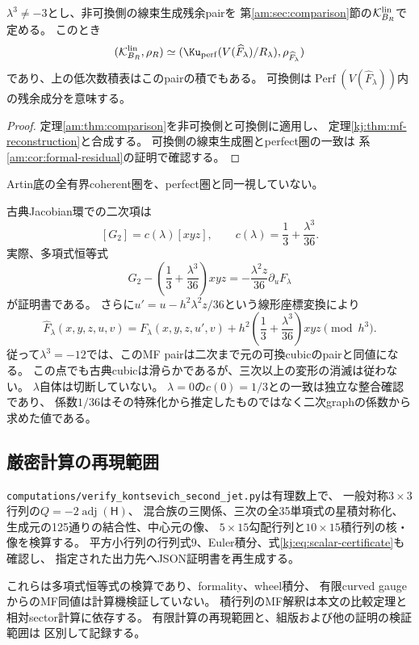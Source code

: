 \begin{corollary}[線束生成射影残余pairの二次復元]
\label{kj:cor:conditional-Ku}
$\lambda^3\ne-3$とし、非可換側の線束生成残余pairを
第\ref{am:sec:comparison}節の$\mathcal K_{B_R}^{\rm lin}$で定める。
このとき
\[
 (\mathcal K_{B_R}^{\rm lin},\rho_R)\simeq
 (\Ku_{\rm perf}(V(\widehat F_\lambda)/R_\lambda),\rho_{\widehat F_\lambda})
\]
であり、上の低次数積表はこのpairの積でもある。
可換側は$\operatorname{Perf}(V(\widehat F_\lambda))$内の残余成分を意味する。
\end{corollary}
\begin{proof}
定理\ref{am:thm:comparison}を非可換側と可換側に適用し、
定理\ref{kj:thm:mf-reconstruction}と合成する。
可換側の線束生成圏とperfect圏の一致は
系\ref{am:cor:formal-residual}の証明で確認する。
\end{proof}
Artin底の全有界coherent圏を、perfect圏と同一視していない。

古典Jacobian環での二次項は
\begin{equation}\label{kj:eq:scalar}
 [G_2]=c(\lambda)[xyz],\qquad
 c(\lambda)=\frac13+\frac{\lambda^3}{36}.
\end{equation}
実際、多項式恒等式
\begin{equation}\label{kj:eq:scalar-certificate}
 G_2-\left(\frac13+\frac{\lambda^3}{36}\right)xyz
 =-\frac{\lambda^2z}{36}\partial_uF_\lambda
\end{equation}
が証明書である。
さらに$u'=u-h^2\lambda^2z/36$という線形座標変換により
\begin{equation}\label{kj:eq:marked-normal-form}
 \widehat F_\lambda(x,y,z,u,v)
 =F_\lambda(x,y,z,u',v)+h^2\left(\frac13+\frac{\lambda^3}{36}\right)xyz
 \pmod{h^3}.
\end{equation}
従って$\lambda^3=-12$では、このMF pairは二次まで元の可換cubicのpairと同値になる。
この点でも古典cubicは滑らかであるが、三次以上の変形の消滅は従わない。
$\lambda$自体は切断していない。
$\lambda=0$の$c(0)=1/3$との一致は独立な整合確認であり、
係数$1/36$はその特殊化から推定したものではなく二次graphの係数から求めた値である。

\subsection{厳密計算の再現範囲}

\texttt{computations/verify\_kontsevich\_second\_jet.py}は有理数上で、
一般対称$3\times3$行列の$Q=-2\operatorname{adj}(\mathsf H)$、
混合族の三関係、三次の全35単項式の星積対称化、
生成元の125通りの結合性、中心元の像、
$5\times15$勾配行列と$10\times15$積行列の核・像を検算する。
平方小行列の行列式$9$、Euler積分、式\eqref{kj:eq:scalar-certificate}も確認し、
指定された出力先へJSON証明書を再生成する。

これらは多項式恒等式の検算であり、formality、wheel積分、
有限curved gaugeからのMF同値は計算機検証していない。
積行列のMF解釈は本文の比較定理と相対sector計算に依存する。
有限計算の再現範囲と、組版および他の証明の検証範囲は
区別して記録する。
